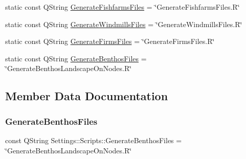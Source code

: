\begin{DoxyCompactItemize}
\item 
static const Q\+String \mbox{\hyperlink{classdisplace_1_1_r_1_1_settings_1_1_scripts_a47a98a4ced7850135d096b193fc070b5}{Generate\+Fishfarms\+Files}} = \char`\"{}Generate\+Fishfarms\+Files.\+R\char`\"{}
\item 
static const Q\+String \mbox{\hyperlink{classdisplace_1_1_r_1_1_settings_1_1_scripts_af1200857cc2af81e352755c7791dac8d}{Generate\+Windmills\+Files}} = \char`\"{}Generate\+Windmills\+Files.\+R\char`\"{}
\item 
static const Q\+String \mbox{\hyperlink{classdisplace_1_1_r_1_1_settings_1_1_scripts_aab7fde483061bfe3938b79e9516bdcb8}{Generate\+Firms\+Files}} = \char`\"{}Generate\+Firms\+Files.\+R\char`\"{}
\item 
static const Q\+String \mbox{\hyperlink{classdisplace_1_1_r_1_1_settings_1_1_scripts_a81804f3fbd3d19d0237535c74e19cb4c}{Generate\+Benthos\+Files}} = \char`\"{}Generate\+Benthos\+Landscape\+On\+Nodes.\+R\char`\"{}
\end{DoxyCompactItemize}


\subsection{Member Data Documentation}
\mbox{\label{classdisplace_1_1_r_1_1_settings_1_1_scripts_a81804f3fbd3d19d0237535c74e19cb4c}} 
\subsubsection{\texorpdfstring{GenerateBenthosFiles}{GenerateBenthosFiles}}
{\footnotesize\ttfamily const Q\+String Settings\+::\+Scripts\+::\+Generate\+Benthos\+Files = \char`\"{}Generate\+Benthos\+Landscape\+On\+Nodes.\+R\char`\"{}\hspace{0.3cm}{\ttfamily [static]}}

\mbox{\label{classdisplace_1_1_r_1_1_settings_1_1_scripts_aab7fde483061bfe3938b79e9516bdcb8}} 
